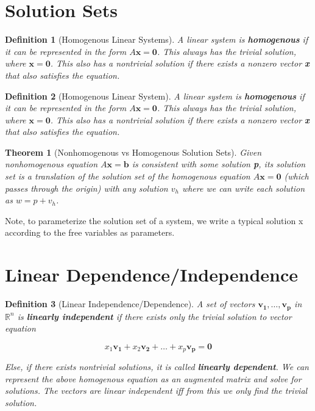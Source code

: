 \documentclass[12pt]{report}
\newtheorem{thm}{Theorem}
\newtheorem{dfn}{Definition}
\begin{document}
\section{Solution Sets}

\begin{dfn}[Homogenous Linear Systems]
A linear system is \textbf{homogenous} if it can be represented in the form $A \bm{x}=\bm{0}$. This always has the trivial solution, where $\bm{x}=\bm{0}$. This also has a nontrivial solution if there exists a nonzero vector \textbf{x} that also satisfies the equation.
\end{dfn}

\begin{dfn}[Homogenous Linear System]
A linear system is \textbf{homogenous} if it can be represented in the form $A\bm{x}=\bm{0}$. This always has the trivial solution, where $\bm{x}=\bm{0}$. This also has a nontrivial solution if there exists a nonzero vector \textbf{x} that also satisfies the equation.
\end{dfn}

\begin{thm}[Nonhomogenous vs Homogenous Solution Sets]
Given nonhomogenous equation $A\bm{x}=\bm{b}$ is consistent with some solution \textbf{p}, its solution set is a translation of the solution set of the homogenous equation $A\bm{x}=\bm{0}$ (which passes through the origin) with any solution $v_h$ where we can write each solution as $w=p+v_h$.
\end{thm}

Note, to parameterize the solution set of a system, we write a typical solution x according to the free variables as parameters.

\section{Linear Dependence/Independence}

\begin{dfn}[Linear Independence/Dependence]
A set of vectors $\bm{v_1},\ldots,\bm{v_p}$ in $\mathbb{R}^n$ is \textbf{linearly independent} if there exists only the trivial solution to vector equation

\begin{equation}
x_1\bm{v_1}+x_2\bm{v_2}+\ldots+x_p\bm{v_p}=\bm{0}
\end{equation}

Else, if there exists nontrivial solutions, it is called \textbf{linearly dependent}. We can represent the above homogenous equation as an augmented matrix and solve for solutions. The vectors are linear independent iff from this we only find the trivial solution.

\end{dfn}
\end{document}
